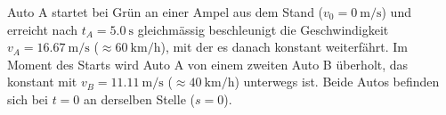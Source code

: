 \documentclass[addpoints,11pt,a4paper]{exam}
\newlength{\antwortraumlen}
\newcommand{\Antwortraum}[1]{%
  \pgfmathsetlength{\antwortraumlen}{#1*2.5cm}%
  \begin{answerbox}
    \rule{0pt}{\antwortraumlen}%
  \end{answerbox}%
}
\begin{document}
\begin{questions}
\begin{taskbox}
\question[16] Auto A startet bei Grün an einer Ampel aus dem Stand
($v_0=\SI{0}{\meter\per\second}$) und erreicht nach $t_A=\SI{5.0}{\second}$
gleichmässig beschleunigt die Geschwindigkeit
$v_A=\SI{16.67}{\meter\per\second}$ ($\approx\SI{60}{\kilo\meter\per\hour}$),
mit der es danach konstant weiterfährt. Im Moment des Starts wird Auto A
von einem zweiten Auto B überholt, das konstant mit
$v_B=\SI{11.11}{\meter\per\second}$ ($\approx\SI{40}{\kilo\meter\per\hour}$)
unterwegs ist. Beide Autos befinden sich bei $t=0$ an derselben Stelle
($s=0$).

\end{taskbox}
\end{questions}
\end{document}
